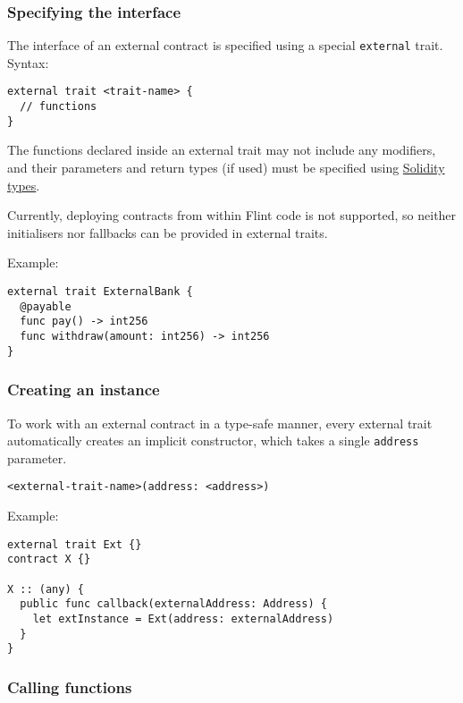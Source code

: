 \subsubsection{Specifying the interface}
\label{sec:appendix-b-specifying-the-interface}

The interface of an external contract is specified using a special \texttt{external} trait. Syntax:

\begin{verbatim}
external trait <trait-name> {
  // functions
}
\end{verbatim}

The functions declared inside an external trait may not include any modifiers, and their parameters and return types (if used) must be specified using \hyperref[sec:appendix-b-solidity-types]{Solidity types}.

Currently, deploying contracts from within Flint code is not supported, so neither initialisers nor fallbacks can be provided in external traits.

Example:

\begin{verbatim}
external trait ExternalBank {
  @payable
  func pay() -> int256
  func withdraw(amount: int256) -> int256
}
\end{verbatim}

\subsubsection{Creating an instance}
\label{sec:appendix-b-creating-an-instance}

To work with an external contract in a type-safe manner, every external trait automatically creates an implicit constructor, which takes a single \texttt{address} parameter.

\begin{verbatim}
<external-trait-name>(address: <address>)
\end{verbatim}

Example:

\begin{verbatim}
external trait Ext {}
contract X {}

X :: (any) {
  public func callback(externalAddress: Address) {
    let extInstance = Ext(address: externalAddress)
  }
}
\end{verbatim}

\subsubsection{Calling functions}
\label{sec:appendix-b-calling-functions}

